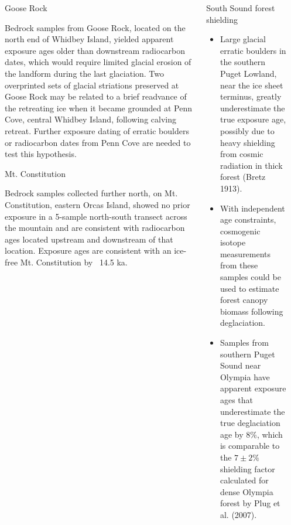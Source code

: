 \documentclass{beamer}
\begin{document}
\begin{frame}{}
\begin{columns}[T]
\begin{column}{0.32\columnwidth}
\end{column}
	
\begin{column}{.32\columnwidth}
	
\begin{block}{Goose Rock}

Bedrock samples from Goose  Rock, located on the north end of Whidbey Island, yielded apparent exposure ages older than downstream radiocarbon dates, which would require limited glacial erosion of the landform during the last glaciation.
Two overprinted sets of glacial striations preserved at Goose Rock may be related to a brief readvance of the retreating ice when it became grounded at Penn Cove, central Whidbey Island, following calving retreat.
Further exposure dating of erratic boulders or radiocarbon dates from Penn Cove are needed to test this hypothesis. 
	
\end{block}
	
\begin{block}{Mt. Constitution}
	
Bedrock samples collected further north, on Mt. Constitution, eastern Orcas Island, showed no prior exposure in a 5-sample north-south transect across the mountain and are consistent with radiocarbon ages located upstream and downstream of that location.
Exposure ages are consistent with an ice-free Mt. Constitution by ~14.5 ka. 

\end{block}

\end{column}

\begin{column}{.32\columnwidth}

\begin{block}{South Sound forest shielding}
\begin{itemize}
\item Large glacial erratic boulders in the southern Puget Lowland, near the ice sheet terminus, greatly underestimate the true exposure age, possibly due to heavy shielding from cosmic radiation in thick forest (Bretz 1913).
\item With independent age constraints, cosmogenic isotope measurements from these samples could be used to estimate forest canopy biomass following deglaciation.
\item Samples from southern Puget Sound near Olympia have apparent exposure ages that underestimate the true deglaciation age by 8\%, which is comparable to the $7\pm2\%$ shielding factor calculated for dense Olympia forest by Plug et al. (2007).
\end{itemize}
\end{block}


\end{column}
\end{columns}
\end{frame}
\end{document}
